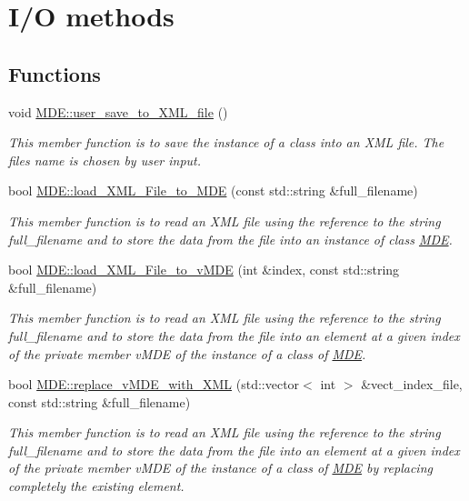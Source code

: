 \hypertarget{group__group__io}{}\section{I/O methods}
\label{group__group__io}
\subsection*{Functions}
\begin{DoxyCompactItemize}
\item 
void \hyperlink{group__group__io_gab0bb5af067d456163cd8d672945acc20}{M\+D\+E\+::user\+\_\+save\+\_\+to\+\_\+\+X\+M\+L\+\_\+file} ()
\begin{DoxyCompactList}\small\item\em This member function is to save the instance of a class into an X\+ML file. The file\textquotesingle{}s name is chosen by user input. \end{DoxyCompactList}\item 
bool \hyperlink{group__group__io_ga299e26c85332bf5effaa64d986184cc6}{M\+D\+E\+::load\+\_\+\+X\+M\+L\+\_\+\+File\+\_\+to\+\_\+\+M\+DE} (const std\+::string \&full\+\_\+filename)
\begin{DoxyCompactList}\small\item\em This member function is to read an X\+ML file using the reference to the string full\+\_\+filename and to store the data from the file into an instance of class \hyperlink{classMDE}{M\+DE}. \end{DoxyCompactList}\item 
bool \hyperlink{group__group__io_gaf9e35ce2a8841994485c22e9744a939f}{M\+D\+E\+::load\+\_\+\+X\+M\+L\+\_\+\+File\+\_\+to\+\_\+v\+M\+DE} (int \&index, const std\+::string \&full\+\_\+filename)
\begin{DoxyCompactList}\small\item\em This member function is to read an X\+ML file using the reference to the string full\+\_\+filename and to store the data from the file into an element at a given index of the private member v\+M\+DE of the instance of a class of \hyperlink{classMDE}{M\+DE}. \end{DoxyCompactList}\item 
bool \hyperlink{group__group__io_gaa51327a2747fbef6e85da046e7661a2e}{M\+D\+E\+::replace\+\_\+v\+M\+D\+E\+\_\+with\+\_\+\+X\+ML} (std\+::vector$<$ int $>$ \&vect\+\_\+index\+\_\+file, const std\+::string \&full\+\_\+filename)
\begin{DoxyCompactList}\small\item\em This member function is to read an X\+ML file using the reference to the string full\+\_\+filename and to store the data from the file into an element at a given index of the private member v\+M\+DE of the instance of a class of \hyperlink{classMDE}{M\+DE} by replacing completely the existing element. \end{DoxyCompactList}\item 

\end{DoxyCompactItemize}
